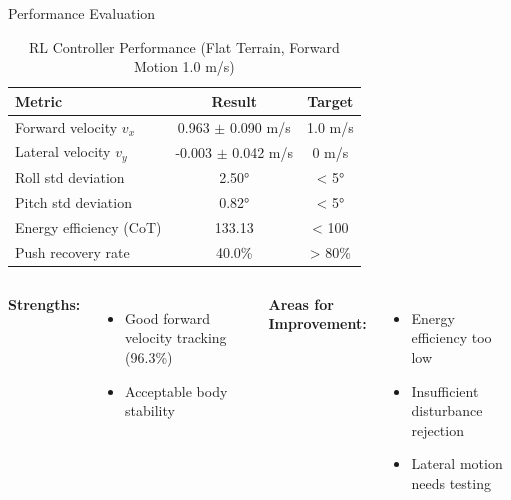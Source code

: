 \documentclass[aspectratio=169]{beamer}
\begin{document}
\begin{frame}{Performance Evaluation}
\begin{table}
\centering
\caption{RL Controller Performance (Flat Terrain, Forward Motion 1.0 m/s)}
\small
\begin{tabular}{lcc}
\toprule
\textbf{Metric} & \textbf{Result} & \textbf{Target} \\
\midrule
Forward velocity $v_x$ & 0.963 $\pm$ 0.090 m/s & 1.0 m/s \\
Lateral velocity $v_y$ & -0.003 $\pm$ 0.042 m/s & 0 m/s \\
Roll std deviation & 2.50° & < 5° \\
Pitch std deviation & 0.82° & < 5° \\
Energy efficiency (CoT) & 133.13 & < 100 \\
Push recovery rate & 40.0\% & > 80\% \\
\bottomrule
\end{tabular}
\end{table}

\vspace{0.3cm}
\begin{columns}[T]
\textbf{Strengths:}
\begin{itemize}
    \item Good forward velocity tracking (96.3\%)
    \item Acceptable body stability
\end{itemize}

\textbf{Areas for Improvement:}
\begin{itemize}
    \item Energy efficiency too low
    \item Insufficient disturbance rejection
    \item Lateral motion needs testing
\end{itemize}
\end{columns}
\end{frame}
\end{document}
